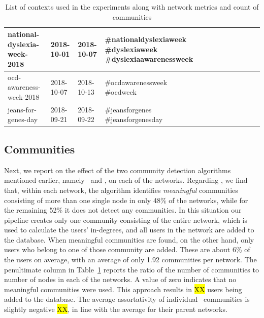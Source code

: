 \documentclass[runningheads]{llncs}
\begin{document}
\begin{table}
{\begin{tabularx}{\textwidth}{|X|X|X|p{2.5cm}|X|X|X|X|X|X|X|X|}
			\hline 
			\rule[-1ex]{0pt}{2.5ex}  national-dyslexia-week-2018          & 2018-10-01  & 2018-10-07 & \#nationaldyslexiaweek \#dyslexiaweek \#dyslexiaawarenessweek               & & & & & \\ 
			\hline 
			\rule[-1ex]{0pt}{2.5ex}  ocd-awareness-week-2018              & 2018-10-07  & 2018-10-13 & \#ocdawarenessweek \#ocdweek         & & & & & \\ 
			\hline 
			\rule[-1ex]{0pt}{2.5ex}  jeans-for-genes-day                  & 2018-09-21  & 2018-09-22 & \#jeansforgenes \#jeansforgenesday           & & & & & \\ 
			\hline 
	\end{tabularx}
	}
	
	\caption{List of contexts used in the experiments along with network metrics and count of \demon communities}
	\label{tab:contexts}
\end{table}	 

\subsection{Communities}  \label{sec:communities}

Next, we report on the effect of the two community detection algorithms mentioned earlier, namely \demon~and \infomap, on each of the networks. 
%
Regarding \demon, we find that, within each network, the algorithm  identifies \textit{meaningful} communities consisting of more than one single node in only 48\% of the networks, while for the remaining 52\% 
it does not detect any communities.
In this situation our pipeline creates only one community consisting of the entire network, which is used to calculate the users' in-degrees, and all users in the network are added to the database.
%
When meaningful communities are found, on the other hand, only users who belong to one of those community are added. 
These are about  6\% of the users on average, with an average of only 1.92 communities per network.
The penultimate column in Table~\ref{tab:contexts} reports the ratio of the number of communities to number of nodes in each of the networks. 
A value of zero indicates that no meaningful communities were used.
%
This approach results in \hl{XX} users being added to the database.
The average assortativity of individual \demon~communities is slightly negative \hl{XX}, in line with the average for their parent networks.
\end{document}
